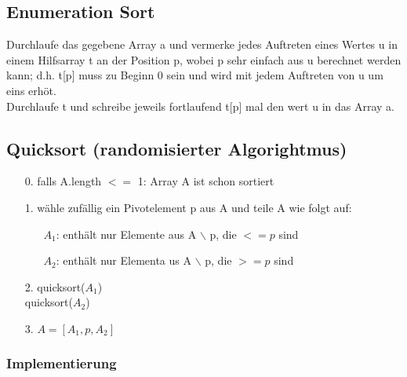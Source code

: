 \documentclass[a4paper,10pt]{article}
\begin{document}
\subsection{Enumeration Sort}
Durchlaufe das gegebene Array a und vermerke jedes Auftreten eines Wertes u in einem Hilfsarray t an der Position p, wobei p sehr einfach aus u berechnet werden kann; d.h. t[p] muss zu Beginn 0 sein und wird mit jedem Auftreten von u um eins erh\"ot. \\
Durchlaufe t und schreibe jeweils fortlaufend t[p] mal den wert u  in das Array a.

\subsection{Quicksort (randomisierter Algorightmus)}
\begin{itemize}
	\item[0.] falls A.length $<=$ 1: Array A ist schon sortiert
	\item[1.] w\"ahle zuf\"allig ein Pivotelement p aus A und teile A wie folgt auf:
		\begin{itemize}
			\item[$A_1$:] enth\"alt nur Elemente aus A $\backslash$ p, die $<= p$ sind
			\item[$A_2$:] enth\"alt nur Elementa us A $\backslash$ p, die $>= p$ sind 
		\end{itemize}
	\item[2.] quicksort($A_1$) \\
		quicksort($A_2$)
	\item[3.] $A = [A_1, p, A_2]$
\end{itemize}
\subsubsection{Implementierung}

\end{document}
